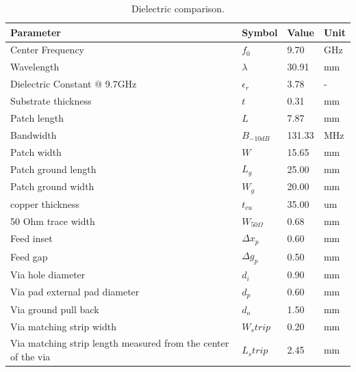     \begin{table}[H]
    \centering
    \caption{Dielectric comparison.}
    \begin{tabular}{|l|l|l|l|} 
    \hline
    \textbf{Parameter}  & \textbf{Symbol}   & \textbf{Value}    & \textbf{Unit}  \\ \hline
    Center Frequency    & \(f_0\)           & 9.70              & GHz            \\ \hline
    Wavelength          & \(\lambda\)       & 30.91             & mm             \\ \hline
    Dielectric Constant @ 9.7GHz&\(\epsilon_{r}\)& 3.78         & -              \\ \hline
    Substrate thickness & \(t\)             & 0.31              & mm             \\ \hline
    Patch length        & \(L\)             & 7.87              & mm             \\ \hline
    Bandwidth           & \(B_{-10dB}\)     & 131.33            & MHz            \\ \hline
    Patch width         & \(W\)             & 15.65             & mm             \\ \hline
    Patch ground length & \(L_g\)           & 25.00             & mm             \\ \hline
    Patch ground width  & \(W_g\)           & 20.00             & mm             \\ \hline
    copper thickness    & \(t_{cu}\)        & 35.00             & um             \\ \hline
    50 Ohm trace width  & \(W_{50\Omega}\)  & 0.68              & mm             \\ \hline
    Feed inset          & \(\Delta x_p\)    & 0.60              & mm             \\ \hline
    Feed gap            & \(\Delta g_p\)    & 0.50              & mm             \\ \hline
    Via hole diameter   & \(d_i\)           & 0.90              & mm             \\ \hline
    Via pad external pad diameter&\(d_p\)   & 0.60              & mm             \\ \hline
    Via ground pull back& \(d_o\)           & 1.50              & mm             \\ \hline
    Via matching strip width& \(W_strip\)   & 0.20              & mm             \\ \hline
    Via matching strip length measured from the center of the via & \(L_strip\)       
                                            & 2.45              & mm             \\
    \hline
    \end{tabular}
    \label{tab:AntennaParam}
    \end{table}

